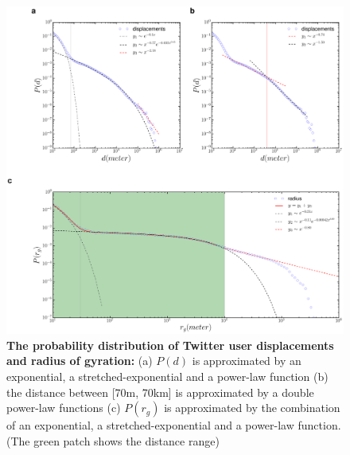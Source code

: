 \documentclass[]{tGIS2e}
\begin{document}
\begin{figure}[ht]
\includegraphics[width=0.9\linewidth]{./figure/S4_radius_displacement}
\caption{{\bf The probability distribution of Twitter user displacements and radius of gyration:} (a) $P(d)$ is approximated by an exponential, a stretched-exponential and a power-law function (b) the distance between [70m, 70km] is approximated by a double power-law functions (c) $P(r_g)$ is approximated by the combination of an exponential, a stretched-exponential and a power-law function. (The green patch shows the distance range)}
\label{S4_Fig}
\end{figure}
\end{document}
